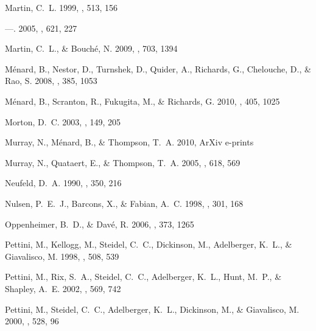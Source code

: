 \documentclass[12pt,preprint]{aastex}
\begin{document}
\begin{thebibliography}{74}
{Martin}, C.~L. 1999, \apj, 513, 156

---. 2005, \apj, 621, 227

{Martin}, C.~L., \& {Bouch{\'e}}, N. 2009, \apj, 703, 1394

{M{\'e}nard}, B., {Nestor}, D., {Turnshek}, D., {Quider}, A., {Richards}, G.,
  {Chelouche}, D., \& {Rao}, S. 2008, \mnras, 385, 1053

{M{\'e}nard}, B., {Scranton}, R., {Fukugita}, M., \& {Richards}, G. 2010,
  \mnras, 405, 1025

{Morton}, D.~C. 2003, \apjs, 149, 205

{Murray}, N., {M{\'e}nard}, B., \& {Thompson}, T.~A. 2010, ArXiv e-prints

{Murray}, N., {Quataert}, E., \& {Thompson}, T.~A. 2005, \apj, 618, 569

{Neufeld}, D.~A. 1990, \apj, 350, 216

{Nulsen}, P.~E.~J., {Barcons}, X., \& {Fabian}, A.~C. 1998, \mnras, 301, 168

{Oppenheimer}, B.~D., \& {Dav{\'e}}, R. 2006, \mnras, 373, 1265

{Pettini}, M., {Kellogg}, M., {Steidel}, C.~C., {Dickinson}, M., {Adelberger},
  K.~L., \& {Giavalisco}, M. 1998, \apj, 508, 539

{Pettini}, M., {Rix}, S.~A., {Steidel}, C.~C., {Adelberger}, K.~L., {Hunt},
  M.~P., \& {Shapley}, A.~E. 2002, \apj, 569, 742

{Pettini}, M., {Steidel}, C.~C., {Adelberger}, K.~L., {Dickinson}, M., \&
  {Giavalisco}, M. 2000, \apj, 528, 96


\end{thebibliography}
\end{document}
